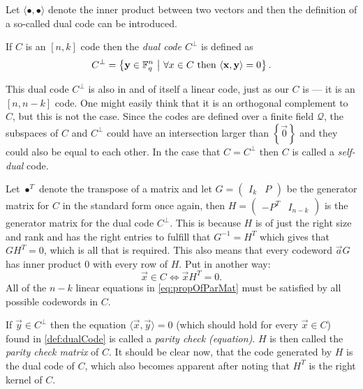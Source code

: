 Let $\langle \bullet , \bullet \rangle$ denote the inner product between two vectors and then the definition of a so-called dual code can be introduced.
\begin{defi}
\label{def:dualCode}
	If $C$ is an $\left[n,k\right]$ code then the \emph{dual code $C^{\bot}$} is defined as
	\begin{equation*}
		C^{\bot} = \left\{ \boldsymbol{\mathrm{y}} \in \mathbb{F}_{q}^{n} \ \middle\vert \ \forall x \in C \ \text{then } \langle \boldsymbol{\mathrm{x}}, \boldsymbol{\mathrm{y}} \rangle = 0 \right\}.
	\end{equation*}
\end{defi}
This dual code $C^{\bot}$ is also in and of itself a linear code, just as our $C$ is --- it is an $\left[n, n-k\right]$ code. One might easily think that it is an orthogonal complement to $C$, but this is not the case. Since the codes are defined over a finite field $\mathcal{Q}$, the subspaces of $C$ and $C^{\bot}$ could have an intersection larger than $\left\{ \vec{0} \right\}$ and they could also be equal to each other. In the case that $C = C^{\bot}$ then $C$ is called a \emph{self-dual} code.

Let $\bullet^{T}$ denote the transpose of a matrix and let $G = \begin{pmatrix}
I_k & P
\end{pmatrix}$ be the generator matrix for $C$ in the standard form once again, then $H = \begin{pmatrix}
-P^T & I_{n-k}
\end{pmatrix}$ is the generator matrix for the dual code $C^{\bot}$. This is because $H$ is of just the right size and rank and has the right entries to fulfill that $G^{-1} = H^T$ which gives that $G H^T = 0$, which is all that is required. This also means that every codeword $\vec{a}G$ has inner product $0$ with every row of $H$. Put in another way:
\begin{equation}
\label{eq:propOfParMat}
\vec{x} \in C \Leftrightarrow \vec{x} H^T = 0.
\end{equation}
All of the $n-k$ linear equations in \cref{eq:propOfParMat} must be satisfied by all possible codewords in $C$.

If $\vec{y} \in C^{\bot}$ then the equation $\langle \vec{x}, \vec{y} \rangle = 0$ (which should hold for every $\vec{x} \in C$) found in \cref{def:dualCode} is called a \emph{parity check (equation)}. $H$ is then called the \emph{parity check matrix} of $C$. It should be clear now, that the code generated by $H$ is the dual code of $C$, which also becomes apparent after noting that $H^T$ is the right kernel of $C$.

